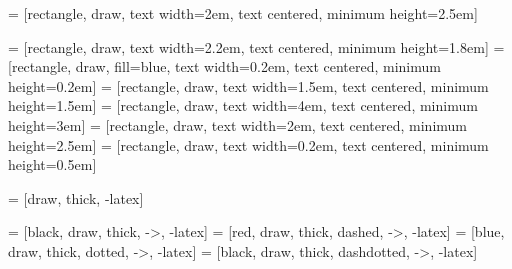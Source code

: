  = [rectangle, draw,  text width=2em, text centered,  minimum height=2.5em]

 = [rectangle, draw,  text width=2.2em, text centered,  minimum height=1.8em]
 = [rectangle, draw,  fill=blue, text width=0.2em, text centered,  minimum height=0.2em]
 = [rectangle, draw,  text width=1.5em, text centered,  minimum height=1.5em]
 = [rectangle, draw,  text width=4em, text centered,  minimum height=3em]
 = [rectangle, draw,  text width=2em, text centered,  minimum height=2.5em]
 = [rectangle, draw,  text width=0.2em, text centered,  minimum height=0.5em]

 = [draw, thick, -latex]

 = [black, draw, thick, ->, -latex]
 = [red, draw, thick, dashed, ->, -latex]
 = [blue, draw, thick, dotted, ->, -latex]
 = [black, draw, thick, dashdotted, ->, -latex]


